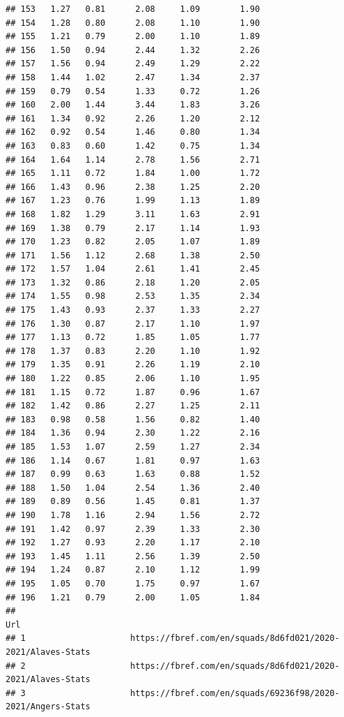 \documentclass[
]{book}
\theoremstyle{definition}
\theoremstyle{definition}
\theoremstyle{definition}
\theoremstyle{definition}
\theoremstyle{remark}
\begin{document}
\begin{verbatim}
## 153   1.27   0.81      2.08     1.09        1.90
## 154   1.28   0.80      2.08     1.10        1.90
## 155   1.21   0.79      2.00     1.10        1.89
## 156   1.50   0.94      2.44     1.32        2.26
## 157   1.56   0.94      2.49     1.29        2.22
## 158   1.44   1.02      2.47     1.34        2.37
## 159   0.79   0.54      1.33     0.72        1.26
## 160   2.00   1.44      3.44     1.83        3.26
## 161   1.34   0.92      2.26     1.20        2.12
## 162   0.92   0.54      1.46     0.80        1.34
## 163   0.83   0.60      1.42     0.75        1.34
## 164   1.64   1.14      2.78     1.56        2.71
## 165   1.11   0.72      1.84     1.00        1.72
## 166   1.43   0.96      2.38     1.25        2.20
## 167   1.23   0.76      1.99     1.13        1.89
## 168   1.82   1.29      3.11     1.63        2.91
## 169   1.38   0.79      2.17     1.14        1.93
## 170   1.23   0.82      2.05     1.07        1.89
## 171   1.56   1.12      2.68     1.38        2.50
## 172   1.57   1.04      2.61     1.41        2.45
## 173   1.32   0.86      2.18     1.20        2.05
## 174   1.55   0.98      2.53     1.35        2.34
## 175   1.43   0.93      2.37     1.33        2.27
## 176   1.30   0.87      2.17     1.10        1.97
## 177   1.13   0.72      1.85     1.05        1.77
## 178   1.37   0.83      2.20     1.10        1.92
## 179   1.35   0.91      2.26     1.19        2.10
## 180   1.22   0.85      2.06     1.10        1.95
## 181   1.15   0.72      1.87     0.96        1.67
## 182   1.42   0.86      2.27     1.25        2.11
## 183   0.98   0.58      1.56     0.82        1.40
## 184   1.36   0.94      2.30     1.22        2.16
## 185   1.53   1.07      2.59     1.27        2.34
## 186   1.14   0.67      1.81     0.97        1.63
## 187   0.99   0.63      1.63     0.88        1.52
## 188   1.50   1.04      2.54     1.36        2.40
## 189   0.89   0.56      1.45     0.81        1.37
## 190   1.78   1.16      2.94     1.56        2.72
## 191   1.42   0.97      2.39     1.33        2.30
## 192   1.27   0.93      2.20     1.17        2.10
## 193   1.45   1.11      2.56     1.39        2.50
## 194   1.24   0.87      2.10     1.12        1.99
## 195   1.05   0.70      1.75     0.97        1.67
## 196   1.21   0.79      2.00     1.05        1.84
##                                                                               Url
## 1                     https://fbref.com/en/squads/8d6fd021/2020-2021/Alaves-Stats
## 2                     https://fbref.com/en/squads/8d6fd021/2020-2021/Alaves-Stats
## 3                     https://fbref.com/en/squads/69236f98/2020-2021/Angers-Stats

\end{verbatim}
\end{document}
